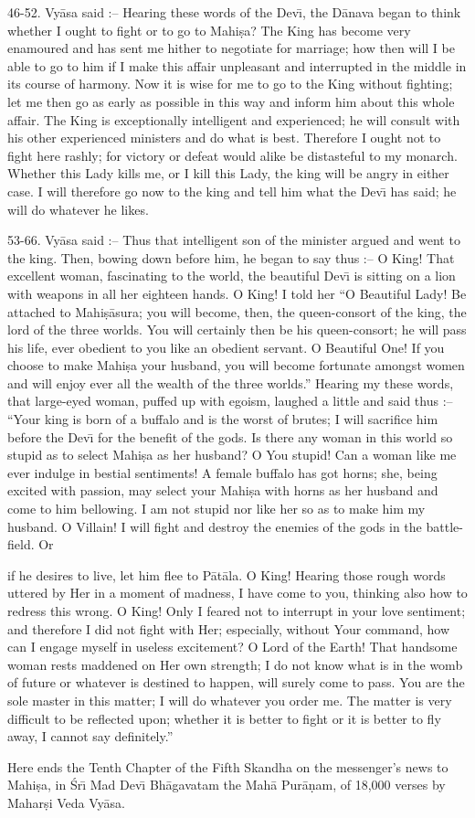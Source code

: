 46-52. Vy\=asa said :-- Hearing these words of the Dev\={\i}, the D\=anava began to think whether I ought to fight or to go to Mahi\d{s}a? The King has become very enamoured and has sent me hither to negotiate for marriage; how then will I be able to go to him if I make this affair unpleasant and interrupted in the middle in its course of harmony. Now it is wise for me to go to the King without fighting; let me then go as early as possible in this way and inform him about this whole affair. The King is exceptionally intelligent and experienced; he will consult with his other experienced ministers and do what is best. Therefore I ought not to fight here rashly; for victory or defeat would alike be distasteful to my monarch. Whether this Lady kills me, or I kill this Lady, the king will be angry in either case. I will therefore go now to the king and tell him what the Dev\={\i} has said; he will do whatever he likes.

53-66. Vy\=asa said :-- Thus that intelligent son of the minister argued and went to the king. Then, bowing down before him, he began to say thus :-- O King! That excellent woman, fascinating to the world, the beautiful Dev\={\i} is sitting on a lion with weapons in all her eighteen hands. O King! I told her ``O Beautiful Lady! Be attached to Mahi\d{s}\=asura; you will become, then, the queen-consort of the king, the lord of the three worlds. You will certainly then be his queen-consort; he will pass his life, ever obedient to you like an obedient servant. O Beautiful One! If you choose to make Mahi\d{s}a your husband, you will become fortunate amongst women and will enjoy ever all the wealth of the three worlds.'' Hearing my these words, that large-eyed woman, puffed up with egoism, laughed a little and said thus :-- ``Your king is born of a buffalo and is the worst of brutes; I will sacrifice him before the Dev\={\i} for the benefit of the gods. Is there any woman in this world so stupid as to select Mahi\d{s}a as her husband? O You stupid! Can a woman like me ever indulge in bestial sentiments! A female buffalo has got horns; she, being excited with passion, may select your Mahi\d{s}a with horns as her husband and come to him bellowing. I am not stupid nor like her so as to make him my husband. O Villain! I will fight and destroy the enemies of the gods in the battle-field. Or

if he desires to live, let him flee to P\=at\=ala. O King! Hearing those rough words uttered by Her in a moment of madness, I have come to you, thinking also how to redress this wrong. O King! Only I feared not to interrupt in your love sentiment; and therefore I did not fight with Her; especially, without Your command, how can I engage myself in useless excitement? O Lord of the Earth! That handsome woman rests maddened on Her own strength; I do not know what is in the womb of future or whatever is destined to happen, will surely come to pass. You are the sole master in this matter; I will do whatever you order me. The matter is very difficult to be reflected upon; whether it is better to fight or it is better to fly away, I cannot say definitely.''

Here ends the Tenth Chapter of the Fifth Skandha on the messenger's news to Mahi\d{s}a, in \'Sr\={\i} Mad Dev\={\i} Bh\=agavatam the Mah\=a Pur\=a\d{n}am, of 18,000 verses by Mahar\d{s}i Veda Vy\=asa.



